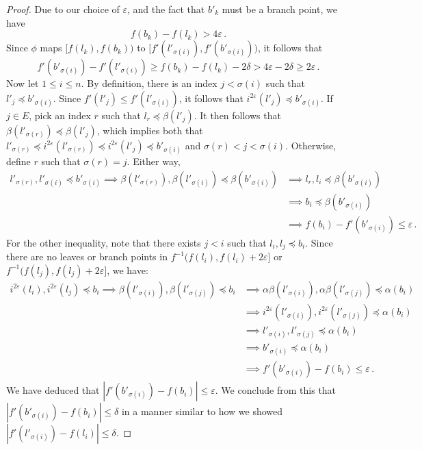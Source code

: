 \documentclass{article}
\theoremstyle{definition}
\renewcommand{\epsilon}{\varepsilon}
\begin{document}
\begin{proof}
    Due to our choice of $\epsilon$, and the fact that $b'_k$ must be a branch point, we have
    \begin{equation*}
        f(b_k) - f(l_k) > 4\epsilon\,.
    \end{equation*}
    Since $\phi$ maps $\big[f(l_k), f(b_k)\big)$ to $\big[f'(l'_{\sigma(i)}), f'(b'_{\sigma(i)})\big)$, it follows that
    \begin{equation*}
        f'(b'_{\sigma(i)}) - f'(l'_{\sigma(i)}) \geq f(b_k) - f(l_k) - 2\delta > 4\epsilon - 2\delta \geq  2\epsilon\,.
    \end{equation*}
    Now let $1 \leq i \leq n$. By definition, there is an index $j< \sigma(i)$ such that $l'_j \preceq b'_{\sigma(i)}$. Since $f'(l'_j) \leq f'(l'_{\sigma(i)})$, it follows that $i^{2\epsilon}(l'_j) \preceq b'_{\sigma(i)}$. If $j \in E$, pick an index $r$ such that $l_r \preceq \beta(l'_j)$. It then follows that $\beta(l'_{\sigma(r)}) \preceq \beta(l'_j)$, which implies both that $l'_{\sigma(r)} \preceq i^{2\epsilon}(l'_{\sigma(r)}) \preceq i^{2\epsilon}(l'_{j}) \preceq b'_{\sigma(i)}$ and $\sigma(r) < j < \sigma(i)$. Otherwise, define $r$ such that $\sigma(r) = j$. Either way,
    \begin{align*}
        l'_{\sigma(r)}, l'_{\sigma(i)} \preceq b'_{\sigma(i)} \implies \beta(l'_{\sigma(r)}), \beta(l'_{\sigma(i)}) \preceq \beta(b'_{\sigma(i)}) &\implies l_r,l_i \preceq \beta(b'_{\sigma(i)})\\
        &\implies b_i \preceq \beta(b'_{\sigma(i)})\\
        &\implies f(b_i) - f'(b'_{\sigma(i)}) \leq \epsilon\,.
    \end{align*}
    For the other inequality, note that there exists $j<i$ such that $l_i,l_j \preceq b_i$. Since there are no leaves or branch points in $f^{-1}(f(l_i), f(l_i) + 2\epsilon]$ or $f^{-1}(f(l_j), f(l_j) + 2\epsilon]$, we have:
    \begin{align*}
        i^{2\epsilon}(l_i), i^{2\epsilon}(l_j) \preceq b_i \implies \beta(l'_{\sigma(i)}), \beta(l'_{\sigma(j)}) \preceq b_i &\implies \alpha\beta(l'_{\sigma(i)}), \alpha\beta(l'_{\sigma(j)}) \preceq \alpha(b_i)\\
        &\implies i^{2\epsilon}(l'_{\sigma(i)}), i^{2\epsilon}(l'_{\sigma(j)}) \preceq \alpha(b_i)\\
        &\implies l'_{\sigma(i)}, l'_{\sigma(j)} \preceq \alpha(b_i)\\
        &\implies b'_{\sigma(i)} \preceq \alpha(b_i)\\
        &\implies f'(b'_{\sigma(i)}) - f(b_i) \leq \epsilon\,.
    \end{align*}
    We have deduced that $|f'(b'_{\sigma(i)}) - f(b_i)| \leq \epsilon$. We conclude from this that $|f'(b'_{\sigma(i)}) - f(b_i)| \leq \delta$ in a manner similar to how we showed $|f'(l'_{\sigma(i)}) - f(l_i)| \leq \delta$.
\end{proof}
\end{document}

